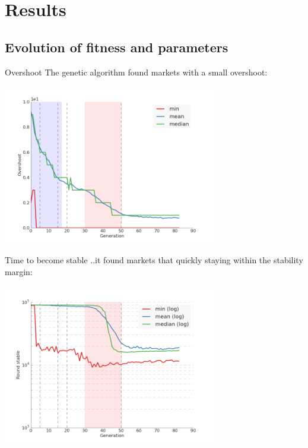 \documentclass[14pt]{beamer}
\begin{document}
	
\section{Results}
\begin{frame}
\tableofcontents[currentsection]
\end{frame}

\subsection{Evolution of fitness and parameters}
\begin{frame}
\tableofcontents[currentsection]
\end{frame}

\begin{frame}{Overshoot}
The genetic algorithm found markets with a small overshoot:
\begin{center}
\includegraphics[width=0.7\textwidth]{evolution/overshoot.png}
\end{center}
\end{frame}

\begin{frame}{Time to become stable}
..it found markets that quickly staying within the stability margin:
\begin{center}
\includegraphics[width=0.7\textwidth]{evolution/round_stable.png}
\end{center}
\end{frame}
\end{document}
